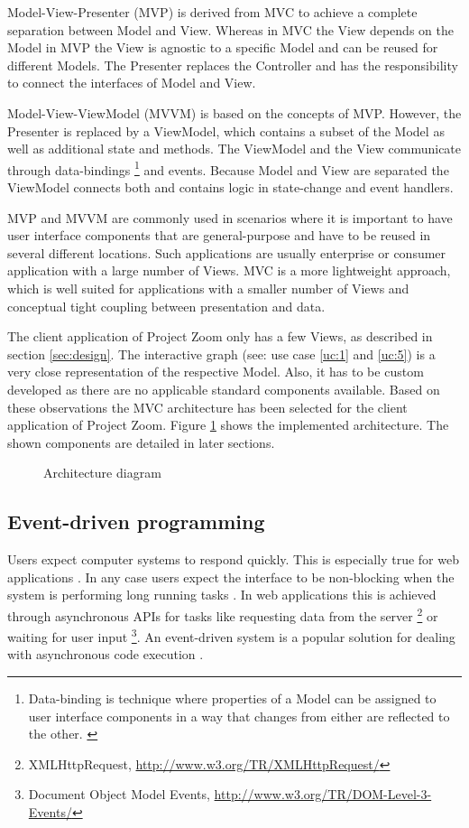 Model-View-Presenter (MVP) is derived from MVC to achieve a complete separation between Model and View. Whereas in MVC the View depends on the Model in MVP the View is agnostic to a specific Model and can be reused for different Models. The Presenter replaces the Controller and has the responsibility to connect the interfaces of Model and View. 

Model-View-ViewModel (MVVM) is based on the concepts of MVP. However, the Presenter is replaced by a ViewModel, which contains a subset of the Model as well as additional state and methods. The ViewModel and the View communicate through data-bindings \footnote{Data-binding is technique where properties of a Model can be assigned to user interface components in a way that changes from either are reflected to the other. \cite{Bent_2004}} and events. Because Model and View are separated the ViewModel connects both and contains logic in state-change and event handlers.

MVP and MVVM are commonly used in scenarios where it is important to have user interface components that are general-purpose and have to be reused in several different locations. Such applications are usually enterprise or consumer application with a large number of Views. MVC is a more lightweight approach, which is well suited for applications with a smaller number of Views and conceptual tight coupling between presentation and data. \cite{Osmani_2012}

The client application of Project Zoom only has a few Views, as described in section \ref{sec:design}. The interactive graph (see: use case \ref{uc:1} and \ref{uc:5}) is a very close representation of the respective Model. Also, it has to be custom developed as there are no applicable standard components available. Based on these observations the MVC architecture has been selected for the client application of Project Zoom. Figure \ref{fig:arch} shows the implemented architecture. The shown components are detailed in later sections.

\begin{figure}
\caption{Architecture diagram}
\label{fig:arch}
\end{figure}

\subsection{Event-driven programming}

Users expect computer systems to respond quickly. This is especially true for web applications \cite{Selvidge_1999}. In any case users expect the interface to be non-blocking when the system is performing long running tasks \cite{Nielsen_1994}.  In web applications this is achieved through asynchronous APIs for tasks like requesting data from the server \footnote{XMLHttpRequest, \url{http://www.w3.org/TR/XMLHttpRequest/}} or waiting for user input \footnote{Document Object Model Events, \url{http://www.w3.org/TR/DOM-Level-3-Events/}}. An event-driven system is a popular solution for dealing with asynchronous code execution \cite{Michelson_2006}. 

